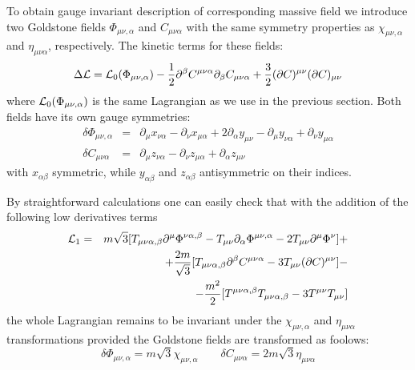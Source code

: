 \documentclass[a4paper,12pt]{article}
\begin{document}
To obtain gauge invariant description of corresponding massive field we
introduce two Goldstone fields $\Phi_{\mu\nu,\alpha}$ and $C_{\mu\nu\alpha}$
with the same symmetry properties as $\chi_{\mu\nu,\alpha}$ and
$\eta_{\mu\nu\alpha}$, respectively. The kinetic terms for these fields:
\begin{equation}
\Delta {\cal L} = {\cal L}_0 (\Phi_{\mu\nu,\alpha}) - \frac{1}{2}
\partial^\beta C^{\mu\nu\alpha} \partial_\beta C_{\mu\nu\alpha} +
\frac{3}{2} (\partial C)^{\mu\nu} (\partial C)_{\mu\nu}
\end{equation}
where ${\cal L}_0 (\Phi_{\mu\nu,\alpha})$ is the same Lagrangian as we
use in the previous section. Both fields have its own gauge symmetries:
\begin{eqnarray}
\delta \Phi_{\mu\nu,\alpha} &=& \partial_\mu x_{\nu\alpha} - \partial_\nu
x_{\mu\alpha} + 2 \partial_\alpha y_{\mu\nu} - \partial_\mu y_{\nu\alpha}
+ \partial_\nu y_{\mu\alpha} \nonumber \\
\delta C_{\mu\nu\alpha} &=& \partial_\mu z_{\nu\alpha} - \partial_\nu
z_{\mu\alpha} + \partial_\alpha z_{\mu\nu}
\end{eqnarray}
with $x_{\alpha\beta}$ symmetric, while $y_{\alpha\beta}$ and $z_{\alpha\beta}$
antisymmetric on their indices.

By straightforward calculations one can easily check that with the addition
of the following low derivatives terms
\begin{eqnarray}
{\cal L}_1 &=& m \sqrt{3} [ T_{\mu\nu\alpha,\beta} \partial^\mu
\Phi^{\nu\alpha,\beta} - T_{\mu\nu} \partial_\alpha \Phi^{\mu\nu,\alpha}
- 2 T_{\mu\nu} \partial^\mu \Phi^\nu ] + \nonumber \\
 && + \frac{2m}{\sqrt{3}} [ T_{\mu\nu\alpha,\beta} \partial^\beta
 C^{\mu\nu\alpha} - 3 T_{\mu\nu} (\partial C)^{\mu\nu} ] - \nonumber \\
 && - \frac{m^2}{2} [ T^{\mu\nu\alpha,\beta} T_{\mu\nu\alpha,\beta}
- 3 T^{\mu\nu} T_{\mu\nu} ]
\end{eqnarray}
the whole Lagrangian remains to be invariant under the $\chi_{\mu\nu,\alpha}$
and $\eta_{\mu\nu\alpha}$ transformations provided the Goldstone
fields are transformed as foolows:
\begin{equation}
\delta \Phi_{\mu\nu,\alpha} = m \sqrt{3} \chi_{\mu\nu,\alpha} \qquad
\delta C_{\mu\nu\alpha} = 2 m \sqrt{3} \eta_{\mu\nu\alpha}
\end{equation}
\end{document}
